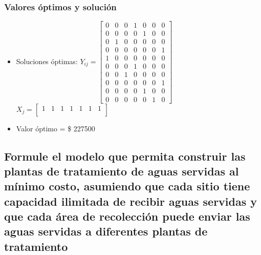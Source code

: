 \documentclass[a4paper,12pt]{article}
\begin{document}
\subsubsection{Valores óptimos y solución}
\begin{itemize}
	\item Soluciones óptimas: $Y_{ij}=
	\begin{bmatrix}
	0 & 0 & 0 & 1 & 0 & 0 & 0\\
	0 & 0 & 0 & 0 & 1 & 0 & 0\\
	0 & 1 & 0 & 0 & 0 & 0 & 0\\
	0 & 0 & 0 & 0 & 0 & 0 & 1\\
	1 & 0 & 0 & 0 & 0 & 0 & 0\\
	0 & 0 & 0 & 1 & 0 & 0 & 0\\
	0 & 0 & 1 & 0 & 0 & 0 & 0\\
	0 & 0 & 0 & 0 & 0 & 0 & 1\\
	0 & 0 & 0 & 0 & 1 & 0 & 0\\
	0 & 0 & 0 & 0 & 0 & 1 & 0
	\end{bmatrix}$
	\\
	$X_{j}=
	\begin{bmatrix}
	1 & 1 & 1 & 1 & 1 & 1 & 1\\
	\end{bmatrix}$
	\item Valor óptimo = \$ 227500
\end{itemize}
\subsection{Formule  el  modelo  que  permita  construir  las  plantas de  tratamiento  de  aguas  servidas  al  mínimo  costo, asumiendo  que  cada  sitio  tiene  capacidad  ilimitada de  recibir  aguas  servidas  y  que  cada  área  de  recolección puede enviar las aguas servidas a diferentes plantas de tratamiento}
\end{document}
